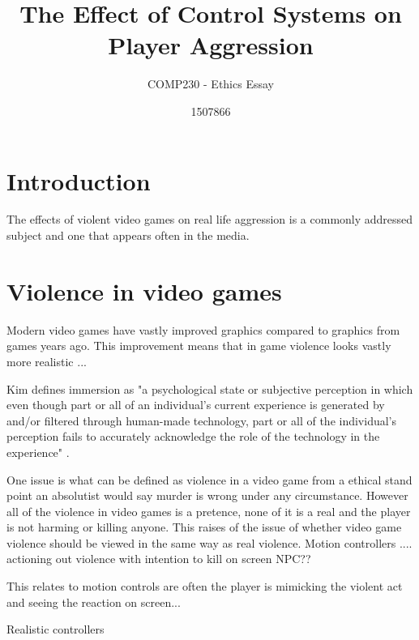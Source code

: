 \documentclass{scrartcl}
\title{The Effect of Control Systems on Player Aggression }
\subtitle{COMP230 - Ethics Essay}
\author{1507866}
\begin{document}
	
\maketitle
	
	
\section{Introduction}
The effects of violent video games on real life aggression is a commonly addressed subject and one that appears often in the media. 

\section{Violence in video games}
 
Modern video games have vastly improved graphics compared to graphics from games years ago. \cite{Caranagey} This improvement means that in game violence looks vastly more realistic ...

Kim defines immersion as "a psychological state or  subjective  perception  in which  even   though   part   or   all   of   an   individual’s   current   experience  is  generated  by  and/or  filtered  through  human-made  technology,  part  or  all  of  the  individual’s  perception  fails  to  accurately   acknowledge   the   role   of   the   technology   in   the   experience" \cite{Kim}.


One issue is what can be defined as violence in a video game from a ethical stand point an absolutist would say murder is wrong under any circumstance. \cite{forsyth1980taxonomy} However all of the violence in video games is a pretence, none of it is a real and the player is not harming or killing anyone. \cite{Tavinor} This raises of the issue of whether video game violence should be viewed in the same way as real violence. Motion controllers .... actioning out violence with intention to kill on screen NPC??

This relates to motion controls are often the player is mimicking the violent act and seeing the reaction on screen...


Realistic controllers \cite{McGloin}
\end{document}
